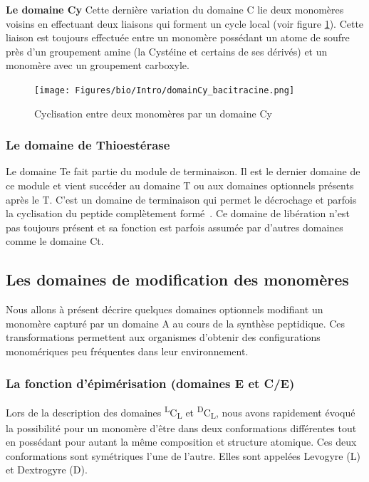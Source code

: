 \textbf{Le domaine Cy}
\label{Cy}
Cette dernière variation du domaine C lie deux monomères voisins en effectuant deux liaisons qui forment un cycle local (voir figure \ref{domaine_Cy}).
Cette liaison est toujours effectuée entre un monomère possédant un atome de soufre près d'un groupement amine (la Cystéine et certains de ses dérivés) et un monomère avec un groupement carboxyle.

\begin{figure}[h!]
  \begin{center}
    \texttt{[image: Figures/bio/Intro/domainCy\_bacitracine.png]}
    \caption{\label{domaine_Cy}Cyclisation entre deux monomères par un domaine Cy}
  \end{center}
\end{figure}


\subsubsection{Le domaine de Thioestérase}

Le domaine Te fait partie du module de terminaison.
Il est le dernier domaine de ce module et vient succéder au domaine T ou aux domaines optionnels présents après le T.
C'est un domaine de terminaison qui permet le décrochage et parfois la cyclisation du peptide complètement formé~\cite{trauger_peptide_2000,kohli_thioesterase_2002}.
Ce domaine de libération n'est pas toujours présent et sa fonction est parfois assumée par d'autres domaines comme le domaine Ct.


\subsection{Les domaines de modification des monomères}

\label{mono_modifs}

Nous allons à présent décrire quelques domaines optionnels modifiant un monomère capturé par un domaine A au cours de la synthèse peptidique.
Ces transformations permettent aux organismes d'obtenir des configurations monomériques peu fréquentes dans leur environnement.


\subsubsection{La fonction d'épimérisation (domaines E et C/E)}
\label{epimeri}

Lors de la description des domaines \textsuperscript{L}C\textsubscript{L} et \textsuperscript{D}C\textsubscript{L}, nous avons rapidement évoqué la possibilité pour un monomère d'être dans deux conformations différentes tout en possédant pour autant la même composition et structure atomique.
Ces deux conformations sont symétriques l'une de l'autre.
Elles sont appelées Levogyre (L) et Dextrogyre (D).

